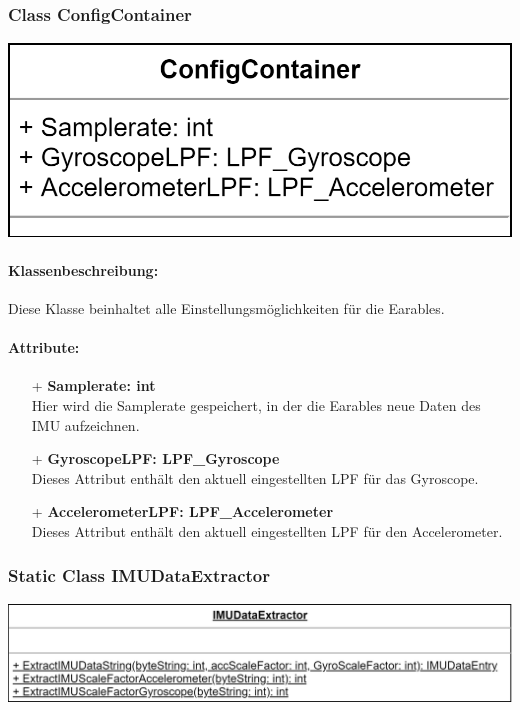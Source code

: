 \documentclass[a4paper,12pt]{article}
\begin{document}
\begin{minipage}[b]{0.7\textwidth}
	\subsubsection{Class ConfigContainer}
	\end{minipage}
	\begin{minipage}[c]{0.3\textwidth}
	\includegraphics[width=\textwidth]{bilder/BibPackageKlassen/ConfigContainer.png}
\end{minipage}
\paragraph{Klassenbeschreibung:}
Diese Klasse beinhaltet alle Einstellungsmöglichkeiten für die \Gls{Earables}.

\paragraph{Attribute:}
\begin{itemize}
	\item[+] \textbf{Samplerate: int}\\Hier wird die Samplerate gespeichert, in der die \Gls{Earables} neue Daten des IMU aufzeichnen.
	\item[+] \textbf{GyroscopeLPF: LPF\_Gyroscope}\\Dieses Attribut enthält den aktuell eingestellten LPF für das Gyroscope.
	\item[+] \textbf{AccelerometerLPF: LPF\_Accelerometer}\\Dieses Attribut enthält den aktuell eingestellten LPF für den Accelerometer.
\end{itemize}


	\subsubsection{Static Class IMUDataExtractor}

	\includegraphics[width=\textwidth]{bilder/BibPackageKlassen/IMUDataExtractor.png}
\end{document}
